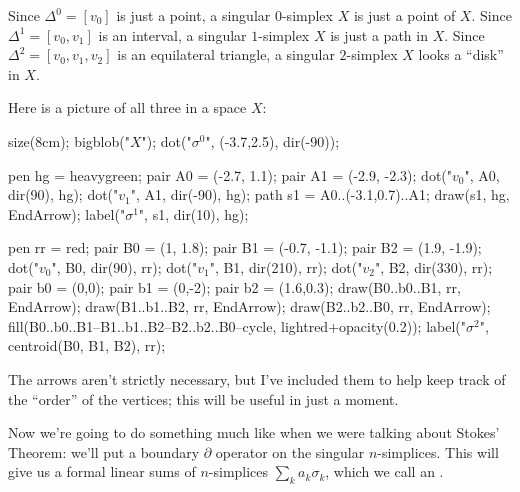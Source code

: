 \begin{example}
	\listhack
	\label{ex:simplex}
	\begin{enumerate}[(a)]
		\ii Since $\Delta^0 = [v_0]$ is just a point,
		a singular $0$-simplex $X$ is just a point of $X$.
		\ii Since $\Delta^1 = [v_0, v_1]$ is an interval,
		a singular $1$-simplex $X$ is just a path in $X$.
		\ii Since $\Delta^2 = [v_0, v_1, v_2]$ is an equilateral triangle,
		a singular $2$-simplex $X$ looks a ``disk'' in $X$.
	\end{enumerate}
	Here is a picture of all three in a space $X$:
	\begin{center}
		\begin{asy}
			size(8cm);
			bigblob("$X$");
			dot("$\sigma^0$", (-3.7,2.5), dir(-90));

			pen hg = heavygreen;
			pair A0 = (-2.7, 1.1);
			pair A1 = (-2.9, -2.3);
			dot("$v_0$", A0, dir(90), hg);
			dot("$v_1$", A1, dir(-90), hg);
			path s1 = A0..(-3.1,0.7)..A1;
			draw(s1, hg, EndArrow);
			label("$\sigma^1$", s1, dir(10), hg);

			pen rr = red;
			pair B0 = (1, 1.8);
			pair B1 = (-0.7, -1.1);
			pair B2 = (1.9, -1.9);
			dot("$v_0$", B0, dir(90), rr);
			dot("$v_1$", B1, dir(210), rr);
			dot("$v_2$", B2, dir(330), rr);
			pair b0 = (0,0);
			pair b1 = (0,-2);
			pair b2 = (1.6,0.3);
			draw(B0..b0..B1, rr, EndArrow);
			draw(B1..b1..B2, rr, EndArrow);
			draw(B2..b2..B0, rr, EndArrow);
			fill(B0..b0..B1--B1..b1..B2--B2..b2..B0--cycle, lightred+opacity(0.2));
			label("$\sigma^2$", centroid(B0, B1, B2), rr);
		\end{asy}
	\end{center}
	The arrows aren't strictly necessary, but I've included them
	to help keep track of the ``order'' of the vertices;
	this will be useful in just a moment.
\end{example}

Now we're going to do something much like when we were talking about Stokes' Theorem:
we'll put a boundary $\partial$ operator on the singular $n$-simplices.
This will give us a formal linear sums of $n$-simplices $\sum_k a_k \sigma_k$,
which we call an .

